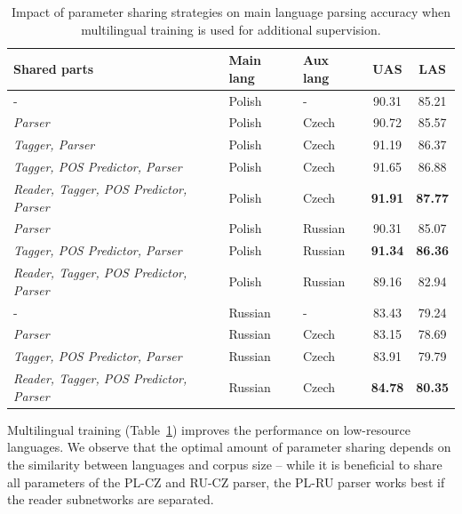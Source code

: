 \begin{table}[!htbp]
  \centering  
  \begin{tabular}{l | l l c c}
    Shared parts & Main lang & Aux lang & UAS & LAS \\ \hline
      - & Polish & - & 90.31 & 85.21 \\
    \emph{Parser} & Polish & Czech & 90.72 & 85.57 \\ %
    \emph{Tagger, Parser} & Polish & Czech & 91.19 & 86.37 \\ %
    \emph{Tagger, POS Predictor, Parser} & Polish & Czech & 91.65 & 86.88 \\ %
    \emph{Reader, Tagger, POS Predictor, Parser} & Polish & Czech & \textbf{91.91} & \textbf{87.77} \\\hline %
    \emph{Parser} & Polish & Russian & 90.31 & 85.07 \\  %
    \emph{Tagger, POS Predictor, Parser} & Polish & Russian &
    \textbf{91.34} & \textbf{86.36} \\ 
    \emph{Reader, Tagger, POS Predictor, Parser} & Polish & Russian & 89.16 & 82.94 \\  %
\hline\hline %
    - & Russian & - & 83.43 & 79.24 \\
    \emph{Parser} & Russian & Czech & 83.15 & 78.69 \\  %
    \emph{Tagger, POS Predictor, Parser} & Russian & Czech & 83.91 & 79.79 \\ %
    \emph{Reader, Tagger, POS Predictor, Parser} & Russian & Czech & \textbf{84.78} & \textbf{80.35} %
  \end{tabular}
  \label{tab:multi_baseline}
  \caption{Impact of parameter sharing strategies on main language parsing accuracy when multilingual training
    is used for additional supervision.}
\end{table}


Multilingual training (Table~\ref{tab:multi_baseline}) improves the performance on low-resource languages.
We observe that the optimal amount of parameter sharing depends on the similarity
between languages and corpus size – while it is beneficial to share all parameters of the
PL-CZ and RU-CZ parser, the PL-RU parser works best if the reader subnetworks are
separated. 

